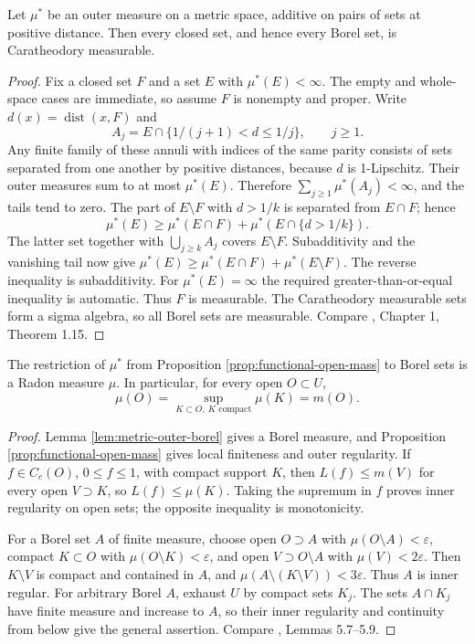 \begin{lemma}\label{lem:metric-outer-borel}
Let $\mu^*$ be an outer measure on a metric space, additive on pairs of sets at positive distance. Then every closed set, and hence every Borel set, is Caratheodory measurable.
\end{lemma}
\begin{proof}
Fix a closed set $F$ and a set $E$ with $\mu^*(E)<\infty$. The empty and whole-space cases are immediate, so assume $F$ is nonempty and proper. Write $d(x)=\operatorname{dist}(x,F)$ and
\[
 A_j=E\cap\{1/(j+1)<d\leq1/j\},\qquad j\geq1.
\]
Any finite family of these annuli with indices of the same parity consists of sets separated from one another by positive distances, because $d$ is 1-Lipschitz. Their outer measures sum to at most $\mu^*(E)$. Therefore $\sum_{j\geq1}\mu^*(A_j)<\infty$, and the tails tend to zero. The part of $E\setminus F$ with $d>1/k$ is separated from $E\cap F$; hence
\[
 \mu^*(E)\geq\mu^*(E\cap F)+\mu^*(E\cap\{d>1/k\}).
\]
The latter set together with $\bigcup_{j\geq k}A_j$ covers $E\setminus F$. Subadditivity and the vanishing tail now give $\mu^*(E)\geq\mu^*(E\cap F)+\mu^*(E\setminus F)$. The reverse inequality is subadditivity. For $\mu^*(E)=\infty$ the required greater-than-or-equal inequality is automatic. Thus $F$ is measurable. The Caratheodory measurable sets form a sigma algebra, so all Borel sets are measurable. Compare \cite{Sim18}, Chapter 1, Theorem 1.15.
\end{proof}

\begin{proposition}\label{prop:functional-measure-radon}
The restriction of $\mu^*$ from Proposition \ref{prop:functional-open-mass} to Borel sets is a Radon measure $\mu$. In particular, for every open $O\subset U$,
\[
 \mu(O)=\sup_{K\subset O,\ K\text{ compact}}\mu(K)=m(O).
\]
\end{proposition}
\begin{proof}
Lemma \ref{lem:metric-outer-borel} gives a Borel measure, and Proposition \ref{prop:functional-open-mass} gives local finiteness and outer regularity. If $f\in C_c(O)$, $0\leq f\leq1$, with compact support $K$, then $L(f)\leq m(V)$ for every open $V\supset K$, so $L(f)\leq\mu(K)$. Taking the supremum in $f$ proves inner regularity on open sets; the opposite inequality is monotonicity.

For a Borel set $A$ of finite measure, choose open $O\supset A$ with $\mu(O\setminus A)<\varepsilon$, compact $K\subset O$ with $\mu(O\setminus K)<\varepsilon$, and open $V\supset O\setminus A$ with $\mu(V)<2\varepsilon$. Then $K\setminus V$ is compact and contained in $A$, and $\mu(A\setminus(K\setminus V))<3\varepsilon$. Thus $A$ is inner regular. For arbitrary Borel $A$, exhaust $U$ by compact sets $K_j$. The sets $A\cap K_j$ have finite measure and increase to $A$, so their inner regularity and continuity from below give the general assertion. Compare \cite{Sim18}, Lemmas 5.7--5.9.
\end{proof}


